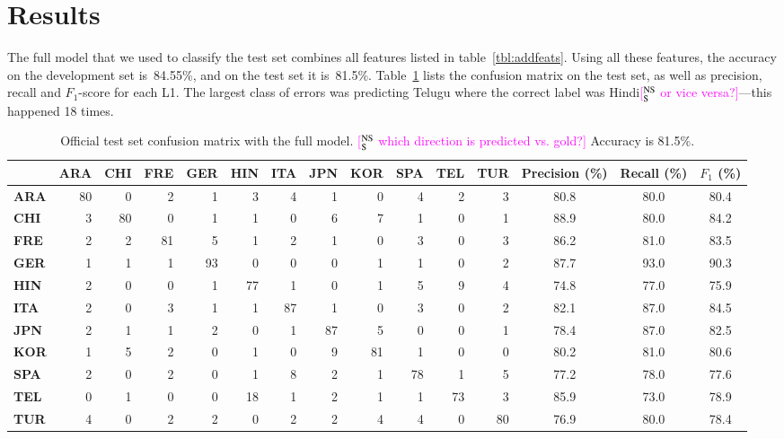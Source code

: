 \documentclass[11pt,letterpaper]{article}
\newcommand{\ensuretext}[1]{#1}
\newcommand{\nssmarker}{\ensuretext{\textcolor{magenta}{\ensuremath{^{\textsc{NS}}_{\textsc{S}}}}}}
\newcommand{\arkcomment}[3]{\ensuretext{\textcolor{#3}{[#1 #2]}}}
\newcommand{\nss}[1]{\arkcomment{\nssmarker}{#1}{magenta}}
\newcommand{\tref}[1]{table~\ref{#1}}
\newcommand{\Tref}[1]{Table~\ref{#1}}
\begin{document}
\section{Results}
\label{sec:results}
The full model that we used to classify the test set combines all
features listed in \tref{tbl:addfeats}. Using all these features, the
accuracy on the development set is~84.55\%, and on the test set it
is~81.5\%. \Tref{tbl:matrix} lists the confusion matrix on the test
set, as well as precision, recall and $F_1$-score for each L1.
The largest class of errors was predicting Telugu where the correct label 
was Hindi\nss{or vice versa?}---this happened 18 times. 



\begin{table*}[hbt]
\small\centering
\begin{tabular}{>{\bf}l|r@{ }r@{ }r@{ }r@{ }r@{ }r@{ }r@{ }r@{ }r@{ }r@{ }r|ccc} %
	& \bf ARA & \bf CHI & \bf FRE & \bf GER & \bf HIN & \bf ITA & \bf JPN & \bf KOR & \bf SPA & \bf TEL & \bf TUR & \bf Precision (\%) & \bf Recall (\%) & \bf $F_1$ (\%) \\
\hline
ARA & 80 & 0 & 2 & 1 & 3 & 4 & 1 & 0 & 4 & 2 & 3 & 80.8 & 80.0 & 80.4 \\
CHI & 3 & 80 & 0 & 1 & 1 & 0 & 6 & 7 & 1 & 0 & 1 & 88.9 & 80.0 & 84.2 \\
FRE & 2 & 2 & 81 & 5 & 1 & 2 & 1 & 0 & 3 & 0 & 3 & 86.2 & 81.0 & 83.5 \\
\hline
GER & 1 & 1 & 1 & 93 & 0 & 0 & 0 & 1 & 1 & 0 & 2 & 87.7 & 93.0 & 90.3 \\
HIN & 2 & 0 & 0 & 1 & 77 & 1 & 0 & 1 & 5 & 9 & 4 & 74.8 & 77.0 & 75.9 \\
ITA & 2 & 0 & 3 & 1 & 1 & 87 & 1 & 0 & 3 & 0 & 2 & 82.1 & 87.0 & 84.5 \\
\hline
JPN & 2 & 1 & 1 & 2 & 0 & 1 & 87 & 5 & 0 & 0 & 1 & 78.4 & 87.0 & 82.5 \\
KOR & 1 & 5 & 2 & 0 & 1 & 0 & 9 & 81 & 1 & 0 & 0 & 80.2 & 81.0 & 80.6 \\
SPA & 2 & 0 & 2 & 0 & 1 & 8 & 2 & 1 & 78 & 1 & 5 & 77.2 & 78.0 & 77.6 \\
\hline
TEL & 0 & 1 & 0 & 0 & 18 & 1 & 2 & 1 & 1 & 73 & 3 & 85.9 & 73.0 & 78.9 \\
TUR & 4 & 0 & 2 & 2 & 0 & 2 & 2 & 4 & 4 & 0 & 80 & 76.9 & 80.0 & 78.4 \\
\end{tabular}
\caption{Official test set confusion matrix with the full model. \nss{which direction is predicted vs. gold?}
Accuracy is 81.5\%.}
\label{tbl:matrix}
\end{table*}
\end{document}
